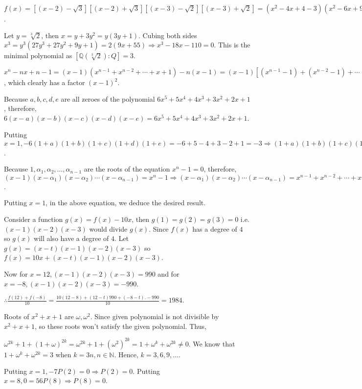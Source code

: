   $f(x) = [(x - 2) - \sqrt{3}][(x - 2) + \sqrt{3}][(x - 3) - \sqrt{2}][(x - 3) + \sqrt{2}] = (x^2 - 4x + 4 -
  3)(x^2 - 6x + 9 - 2) = (x^2 - 4x + 1)(x^2 - 6x + 7) = x^4 - 10x^3 + 32x^2 - 34x + 7 = 0$.
\item Let $y = \sqrt[3]{2}$, then $x = y + 3y^2 = y(3y + 1)$. Cubing both sides $x^3 = y^3(27y^3 + 27y^2 +
  9y + 1) = 2(9x + 55)\Rightarrow x^3 - 18x - 110 = 0$. This is the minimal polynomial as
  $[\mathbb{Q}(\sqrt[3]{2}) : Q] = 3$.
\item $x^n - nx + n - 1 = (x - 1)(x^{n- 1} + x^{n - 2} + \cdots + x + 1) - n(x - 1) = (x - 1)[(x^{n - 1} -
  1) + (x^{n - 2} - 1) + \cdots + (x - 1)]$, which clearly has a factor $(x - 1)^2$.
\item Because $a, b, c, d, e$ are all zeroes of the polynomial $6x^5 + 5x^4 + 4x^3 + 3x^2 + 2x + 1$,
  therefore, $6(x - a)(x - b)(x - c)(x - d)(x - e) = 6x^5 + 5x^4 + 4x^3 + 3x^2 + 2x + 1$.

  Putting $x = 1, -6(1 + a)(1 + b)(1 + c)(1 + d)(1 + e) = -6 + 5 - 4 + 3 - 2 + 1 = -3 \Rightarrow (1 + a)(1
  + b)(1 + c)(1 + d)(1 + e) = \frac{1}{2}$.
\item Because $1, \alpha_1, \alpha_2, \ldots, \alpha_{n - 1}$ are the roots of the equation $x^n - 1 = 0$,
  therefore, $(x - 1)(x - \alpha_1)(x - \alpha_2)\cdots(x - \alpha_{n - 1}) = x^{n} - 1 \Rightarrow (x -
  \alpha_1)(x - \alpha_2)\cdots(x - \alpha_{n - 1}) = x^{n - 1} + x^{n - 2} + \cdots + x + 1$.

  Putting $x = 1$, in the above equation, we deduce the desired result.
\item Consider a function $g(x) = f(x) - 10x$, then $g(1) = g(2) = g(3) = 0$ i.e. $(x - 1)(x - 2)(x - 3)$
  would divide $g(x)$. Since $f(x)$ has a degree of $4$ so $g(x)$ will also have a degree of $4$. Let $g(x)
  = (x - t)(x - 1)(x - 2)(x - 3)$ so $f(x) = 10x + (x - t)(x - 1)(x - 2)(x - 3)$.

  Now for $x = 12, (x - 1)(x - 2)(x - 3) = 990$ and for $x = -8, (x - 1)(x - 2)(x - 3) = -990$.

  $\therefore \frac{f(12) + f(-8)}{10} = \frac{10(12 - 8) + (12 - t)990 + (-8 - t).-990}{10} = 1984$.
\item Roots of $x^2 + x + 1$ are $\omega, \omega^2$. Since given polynomial is not divisible by $x^2 + x +
  1$, so these roots won't satisfy the given polynomial. Thus,

  $\omega^{2k} + 1 + (1 + \omega)^{2k} = \omega^{2k} + 1 + (\omega^2)^{2k} = 1 + \omega^k + \omega^{2k}\neq
  0$. We know that $1 + \omega^k + \omega^{2k} = 3$ when $k = 3n, n\in\mathbb{N}$. Hence, $k = 3, 6, 9,
  \ldots$.
\item Putting $x = 1, -7P(2) = 0 \Rightarrow P(2) = 0$. Putting $x = 8, 0 = 56P(8)\Rightarrow P(8) = 0$.

